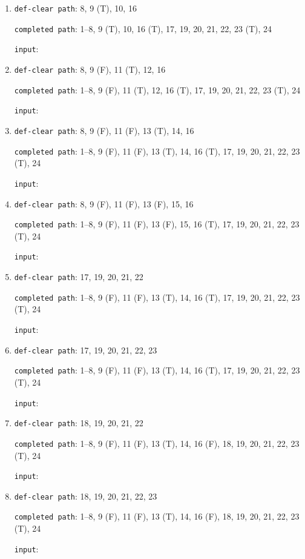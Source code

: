 \documentclass{article}
\begin{document}
\begin{enumerate}
    \item \texttt{def-clear path}: 8, 9 (T), 10, 16
          \par \texttt{completed path}: 1--8, 9 (T), 10, 16 (T), 17, 19, 20, 21, 22, 23 (T), 24
          \par \texttt{input}:

    \item \texttt{def-clear path}: 8, 9 (F), 11 (T), 12, 16
          \par \texttt{completed path}: 1--8, 9 (F), 11 (T), 12, 16 (T), 17, 19, 20, 21, 22, 23 (T), 24
          \par \texttt{input}:

    \item \texttt{def-clear path}: 8, 9 (F), 11 (F), 13 (T), 14, 16
          \par \texttt{completed path}: 1--8, 9 (F), 11 (F), 13 (T), 14, 16 (T), 17, 19, 20, 21, 22, 23 (T), 24
          \par \texttt{input}:

    \item \texttt{def-clear path}: 8, 9 (F), 11 (F), 13 (F), 15, 16
          \par \texttt{completed path}: 1--8, 9 (F), 11 (F), 13 (F), 15, 16 (T), 17, 19, 20, 21, 22, 23 (T), 24
          \par \texttt{input}:

    \item \texttt{def-clear path}: 17, 19, 20, 21, 22
          \par \texttt{completed path}: 1--8, 9 (F), 11 (F), 13 (T), 14, 16 (T), 17, 19, 20, 21, 22, 23 (T), 24
          \par \texttt{input}:

    \item \texttt{def-clear path}: 17, 19, 20, 21, 22, 23
          \par \texttt{completed path}: 1--8, 9 (F), 11 (F), 13 (T), 14, 16 (T), 17, 19, 20, 21, 22, 23 (T), 24
          \par \texttt{input}:

    \item \texttt{def-clear path}: 18, 19, 20, 21, 22
          \par \texttt{completed path}: 1--8, 9 (F), 11 (F), 13 (T), 14, 16 (F), 18, 19, 20, 21, 22, 23 (T), 24
          \par \texttt{input}:

    \item \texttt{def-clear path}: 18, 19, 20, 21, 22, 23
          \par \texttt{completed path}: 1--8, 9 (F), 11 (F), 13 (T), 14, 16 (F), 18, 19, 20, 21, 22, 23 (T), 24
          \par \texttt{input}:
\end{enumerate}
\end{document}
